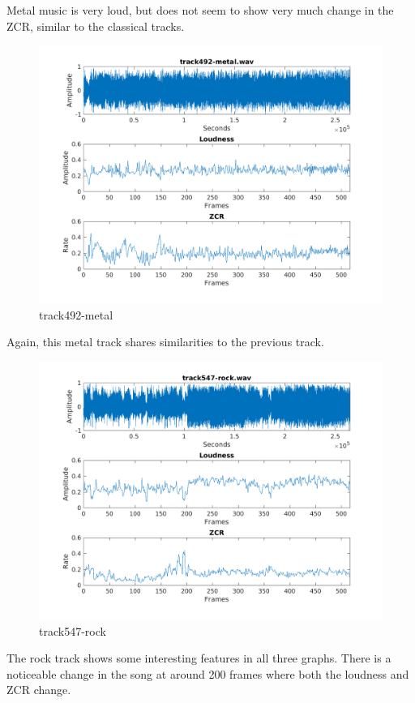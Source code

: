 \documentclass[11pt, a4paper]{article}
\begin{document}
Metal music is very loud, but does not seem to show very much change in the ZCR, similar to the classical tracks. 

\begin{figure}[H]
    \centering
    \includegraphics[width=.8\textwidth]{track492-metal-timedomain.png}
    \caption{track492-metal}
\end{figure}

Again, this metal track shares similarities to the previous track. 


\begin{figure}[H]
    \centering
    \includegraphics[width=.8\textwidth]{track547-rock-timedomain.png}
    \caption{track547-rock}
\end{figure}

The rock track shows some interesting features in all three graphs. There is a noticeable change in the song at around 200 frames where both the loudness and ZCR change. 
\end{document}
